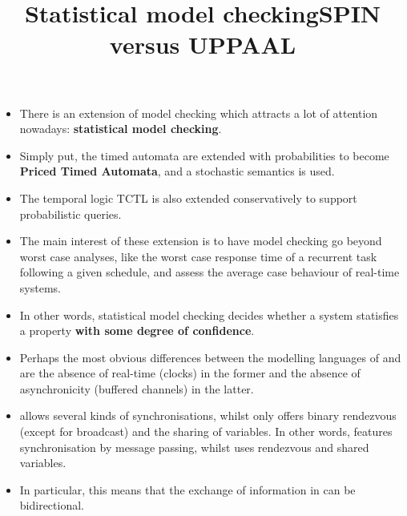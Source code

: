 \documentclass[wide]{slides}
\begin{document}
\begin{slide}
  \title{Statistical model checking}

  \begin{itemize}

    \item There is an extension of model checking which attracts a lot
      of attention nowadays: \textbf{statistical model checking}.

    \item Simply put, the timed automata are extended with
      probabilities to become \textbf{Priced Timed Automata}, and a
      stochastic semantics is used.

    \item The temporal logic TCTL is also extended conservatively to
      support probabilistic queries.

    \item The main interest of these extension is to have model
      checking go beyond worst case analyses, like the worst case
      response time of a recurrent task following a given schedule,
      and assess the average case behaviour of real\hyp{}time systems.

    \item In other words, statistical model checking decides whether a
      system statisfies a property \textbf{with some degree of
        confidence}.

  \end{itemize}

\end{slide}

\begin{slide}
  \title{SPIN versus UPPAAL}

  \begin{itemize}

    \item Perhaps the most obvious differences between the modelling
      languages of \SPIN and \UPPAAL are the absence of real\hyp{}time
      (clocks) in the former and the absence of asynchronicity
      (buffered channels) in the latter.

    \item \Promela allows several kinds of synchronisations, whilst
      \UPPAAL only offers binary rendezvous (except for broadcast) and
      the sharing of variables. In other words, \Promela features
      synchronisation by message passing, whilst \UPPAAL uses
      rendezvous and shared variables.

    \item In particular, this means that the exchange of information
      in \UPPAAL can be bidirectional.

  \end{itemize}
\end{slide}
\end{document}

